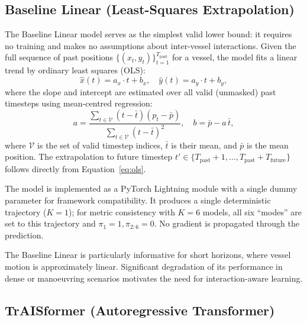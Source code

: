 \documentclass[12pt, a4paper]{article}
\begin{document}
\subsection{Baseline Linear (Least-Squares Extrapolation)}
\label{sec:baseline_linear}

The Baseline Linear model serves as the simplest valid lower bound: it
requires no training and makes no assumptions about inter-vessel
interactions.  Given the full sequence of past positions
$\{(x_t, y_t)\}_{t=1}^{T_{\text{past}}}$ for a vessel, the model fits
a linear trend by ordinary least squares (OLS):
\begin{equation}
  \hat{x}(t) = a_x \cdot t + b_x, \quad
  \hat{y}(t) = a_y \cdot t + b_y,
  \label{eq:ols}
\end{equation}
where the slope and intercept are estimated over all valid (unmasked) past
timesteps using mean-centred regression:
\begin{equation}
  a = \frac{\sum_{t \in \mathcal{V}} (t - \bar{t})(p_t - \bar{p})}
           {\sum_{t \in \mathcal{V}} (t - \bar{t})^2}, \quad
  b = \bar{p} - a\,\bar{t},
  \label{eq:ols_coeff}
\end{equation}
where $\mathcal{V}$ is the set of valid timestep indices, $\bar{t}$ is
their mean, and $\bar{p}$ is the mean position.  The extrapolation to
future timestep $t' \in \{T_{\text{past}}+1, \dots,
T_{\text{past}}+T_{\text{future}}\}$ follows directly from
Equation~\eqref{eq:ols}.

The model is implemented as a PyTorch Lightning module with a single
dummy parameter for framework compatibility.  It produces a single
deterministic trajectory ($K=1$); for metric consistency with
$K=6$ models, all six ``modes'' are set to this trajectory and
$\pi_1 = 1, \pi_{2:6} = 0$.  No gradient is propagated through the
prediction.

The Baseline Linear is particularly informative for short horizons, where
vessel motion is approximately linear.  Significant degradation of its
performance in dense or manoeuvring scenarios motivates the need for
interaction-aware learning.

\subsection{TrAISformer (Autoregressive Transformer)}
\label{sec:traisformer}
\end{document}
